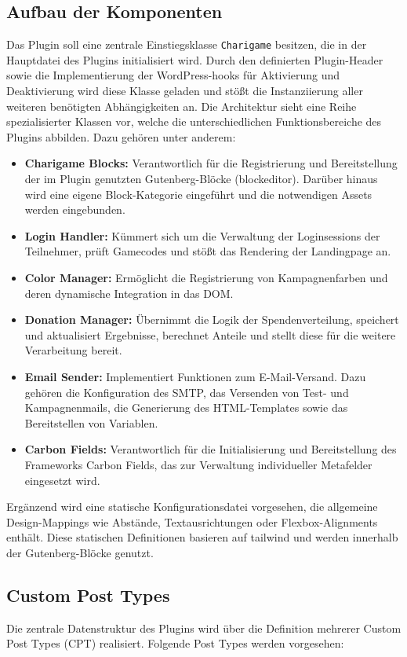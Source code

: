 \subsection{Aufbau der Komponenten}
Das Plugin soll eine zentrale Einstiegsklasse \texttt{Charigame} besitzen, die in der Hauptdatei des Plugins initialisiert wird.
Durch den definierten Plugin-Header sowie die Implementierung der WordPress-\glspl{hook} für Aktivierung und Deaktivierung wird diese Klasse geladen und stößt die Instanziierung aller weiteren benötigten Abhängigkeiten an.
Die Architektur sieht eine Reihe spezialisierter Klassen vor, welche die unterschiedlichen Funktionsbereiche des Plugins abbilden.
Dazu gehören unter anderem:

\begin{itemize}
    \item \textbf{Charigame Blocks:} Verantwortlich für die Registrierung und Bereitstellung der im Plugin genutzten Gutenberg-Blöcke (\gls{blockeditor}).
    Darüber hinaus wird eine eigene Block-Kategorie eingeführt und die notwendigen Assets werden eingebunden.
    \item \textbf{Login Handler:} Kümmert sich um die Verwaltung der Loginsessions der Teilnehmer, prüft Gamecodes und stößt das Rendering der Landingpage an.
    \item \textbf{Color Manager:} Ermöglicht die Registrierung von Kampagnenfarben und deren dynamische Integration in das DOM.
    \item \textbf{Donation Manager:} Übernimmt die Logik der Spendenverteilung, speichert und aktualisiert Ergebnisse, berechnet Anteile und stellt diese für die weitere Verarbeitung bereit.
    \item \textbf{Email Sender:} Implementiert Funktionen zum E-Mail-Versand.
    Dazu gehören die Konfiguration des SMTP, das Versenden von Test- und Kampagnenmails, die Generierung des HTML-Templates sowie das Bereitstellen von Variablen.
    \item \textbf{Carbon Fields:} Verantwortlich für die Initialisierung und Bereitstellung des Frameworks Carbon Fields, das zur Verwaltung individueller Metafelder eingesetzt wird.
\end{itemize}

Ergänzend wird eine statische Konfigurationsdatei vorgesehen, die allgemeine Design-Mappings wie Abstände, Textausrichtungen oder Flexbox-Alignments enthält.
Diese statischen Definitionen basieren auf \gls{tailwind} und werden innerhalb der Gutenberg-Blöcke genutzt.
\newpage
\subsection{Custom Post Types}
Die zentrale Datenstruktur des Plugins wird über die Definition mehrerer Custom Post Types (\gls{CPT}) realisiert.
Folgende Post Types werden vorgesehen:

